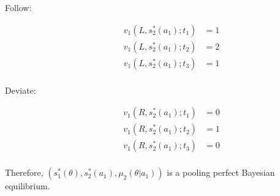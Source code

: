 \documentclass[10pt]{extarticle}
\begin{document}
\begin{description}
\begin{description}
          \item[Follow:]
            \begin{align*}
              v_1(L,s_2^{\ast}(a_1);t_1) &= 1\\
              v_1(L,s_2^{\ast}(a_1);t_2) &= 2\\
              v_1(L,s_2^{\ast}(a_1);t_3) &= 1\\
            \end{align*}
          \item[Deviate:]
            \begin{align*}
              v_1(R,s_2^{\ast}(a_1);t_1) &= 0\\
              v_1(R,s_2^{\ast}(a_1);t_2) &= 1\\
              v_1(R,s_2^{\ast}(a_1);t_3) &= 0\\
            \end{align*}
        \end{description}
    \end{description}
    Therefore, $(s_1^{\ast}(\theta),s_2^{\ast}(a_1), \mu_2(\theta|a_1))$ is a pooling perfect Bayesian equilibrium.
\end{document}
